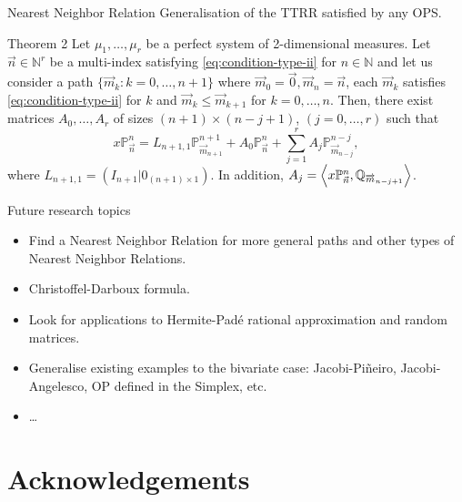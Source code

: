 \documentclass[compress,aspectratio=169]{beamer}
\newcommand{\N}[0]{\mathbb{N}}
\newcommand{\prodesc}[2]{\left\langle #1 , #2 \right\rangle}
\begin{document}
  \begin{frame}{Nearest Neighbor Relation}
	Generalisation of the TTRR satisfied by any OPS.
\begin{block}{Theorem 2}
	Let $\mu_1,\dots,\mu_r$ be a perfect system of 2-dimensional measures. Let $\vec n\in \N^r$ be a multi-index satisfying \eqref{eq:condition-type-ii} for $n\in\N$ and let us consider a path $\{\overrightarrow{m}_k:k=0,\dots,n+1\}$ where $\overrightarrow{m}_0=\vec 0, \overrightarrow{m}_n = \vec n$, each $\overrightarrow{m}_k$ satisfies \eqref{eq:condition-type-ii} for $k$ and $\overrightarrow{m}_k \leq \overrightarrow m_{k+1}$ for $k=0,\dots,n$. Then, there exist matrices $A_0,\dots,A_r$ of sizes $(n+1)\times(n-j+1)$,  $(j=0,\dots,r)$ such that
	\begin{equation}
		\label{eq:nearest-neighbor}
		x\mathbb P_{\vec n}^n = L_{{n+1},1} \mathbb P_{\overrightarrow{m}_{n+1}}^{n+1} + A_0 \mathbb P_{\vec n}^n + \sum_{j=1}^r A_j \mathbb P_{\overrightarrow{m}_{n-j}}^{n-j},
	\end{equation}
	where $L_{n+1,1}=(I_{n+1}|0_{(n+1)\times 1})$. In addition, $A_j =\nolinebreak \prodesc{x\mathbb P_{\vec n}^n}{\mathbb Q_{\overrightarrow{m}_{n-j+1}}}$.
\end{block}
  \end{frame}

  \begin{frame}{Future research topics}
	\begin{itemize}
		\item Find a Nearest Neighbor Relation for more general paths and other types of Nearest Neighbor Relations.
		\item Christoffel-Darboux formula.
		\item Look for applications to Hermite-Padé rational approximation and random matrices.
		\item Generalise existing examples to the bivariate case: Jacobi-Piñeiro, Jacobi-Angelesco, OP defined in the Simplex, etc.
		\item \dots
	  \end{itemize}
  \end{frame}

\section*{Acknowledgements}
\end{document}
